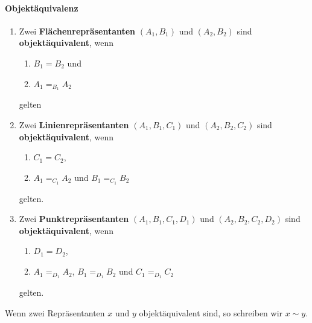         
\paragraph{Objektäquivalenz}
%
    \begin{enumerate}
        \item Zwei \textbf{Flächenrepräsentanten} $(A_1,B_1)$ und $(A_2,B_2)$ sind \textbf{objektäquivalent}, wenn 
            \begin{enumerate}
                \item $B_1 = B_2$ und
                \item $A_1 =_{B_1} A_2$
            \end{enumerate}
            gelten
        \item Zwei \textbf{Linienrepräsentanten} $(A_1,B_1,C_1)$ und $(A_2,B_2,C_2)$ sind \textbf{objektäquivalent}, wenn 
            \begin{enumerate}
                \item $C_1 = C_2$,
                \item $A_1 =_{C_1} A_2$ und $B_1 =_{C_1} B_2$
            \end{enumerate}
            gelten.
        \item Zwei \textbf{Punktrepräsentanten} $(A_1,B_1,C_1,D_1)$ und $(A_2,B_2,C_2,D_2)$ sind \textbf{objektäquivalent}, wenn 
            \begin{enumerate}
                \item $D_1 = D_2$,
                \item $A_1 =_{D_1} A_2$, $B_1 =_{D_1} B_2$ und $C_1 =_{D_1} C_2$
            \end{enumerate}	
            gelten.		
    \end{enumerate}
    
    Wenn zwei Repräsentanten $x$ und $y$ objektäquivalent sind, so schreiben wir $x \sim y$.
    
    
